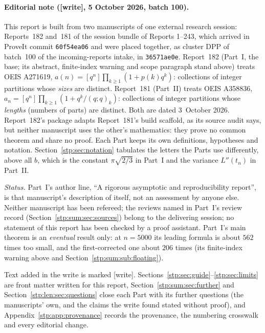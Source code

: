 \documentclass[11pt]{article}
\theoremstyle{remark}\newtheorem{remark}[theorem]{Remark}
\newcommand{\wtag}{\textup{[write]}}
\begin{document}
\paragraph{Editorial note (\wtag, 5 October 2026, batch 100).}
This report is built from two manuscripts of one external research
session: Reports~182 and~181 of the session bundle of Reports 1--243,
which arrived in ProveIt commit \texttt{60f54ea06} and were placed together,
as cluster DPP of batch~100 of the incoming-reports intake, in
\texttt{36571ae0e}. Report~182 (Part~I, the base; its abstract, finite-index
warning and scope paragraph stand above) treats OEIS A271619,
$a(n)=[q^n]\prod_{k\ge1}(1+p(k)q^k)$: collections of integer partitions
whose \emph{sizes} are distinct. Report~181 (Part~II) treats OEIS A358836,
$a_n=[q^n]\prod_{k\ge1}(1+q^k/(q;q)_k)$: collections of integer partitions
whose \emph{lengths} (numbers of parts) are distinct. Both are dated
3~October 2026. Report~182's package adapts Report~181's build scaffold, as
its source audit says, but neither manuscript uses the other's mathematics:
they prove no common theorem and share no proof. Each Part keeps its own
definitions, hypotheses and notation. Section~\ref{stp:sec:notation}
tabulates the letters the Parts use differently, above all $b$, which is the
constant $\pi\sqrt{2/3}$ in Part~I and the variance $L''(t_n)$ in Part~II.

\emph{Status.} Part~I's author line, ``A rigorous asymptotic and
reproducibility report'', is that manuscript's description of itself, not
an assessment by anyone else. Neither manuscript has been refereed; the
reviews named in Part~I's review record (Section~\ref{stp:sum:sec:sources})
belong to the delivering session; no statement of this report has been
checked by a proof assistant. Part~I's main theorem is an \emph{eventual}
result only: at $n=5000$ its leading formula is about $562$ times too small,
and the first-corrected one about $206$ times (its finite-index warning
above and Section~\ref{stp:sum:sub:floating}).

Text added in the write is marked \wtag. Sections~\ref{stp:sec:guide}--\ref{stp:sec:limits}
are front matter written for this report, Section~\ref{stp:sum:sec:further}
and Section~\ref{stp:len:sec:questions} close each Part with its further
questions (the manuscripts' own, and the claims the write found stated
without proof), and Appendix~\ref{stp:app:provenance} records the
provenance, the numbering crosswalk and every editorial change.

\setcounter{tocdepth}{1}
\tableofcontents
\newpage
\end{document}
